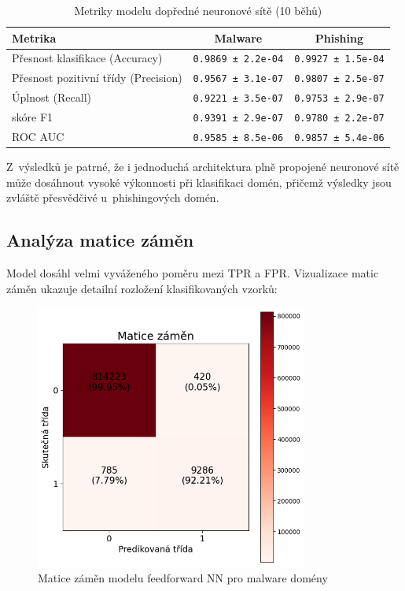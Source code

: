 \begin{table}[h!]
\centering
\begin{tabular}{|l|c|c|}
\hline
\textbf{Metrika} & \textbf{Malware} & \textbf{Phishing} \\
\hline
Přesnost klasifikace (Accuracy) & \texttt{0.9869 ± 2.2e-04} & \texttt{0.9927 ± 1.5e-04} \\
Přesnost pozitivní třídy (Precision) & \texttt{0.9567 ± 3.1e-07} & \texttt{0.9807 ± 2.5e-07} \\
Úplnost (Recall) & \texttt{0.9221 ± 3.5e-07} & \texttt{0.9753 ± 2.9e-07} \\
skóre F1 & \texttt{0.9391 ± 2.9e-07} & \texttt{0.9780 ± 2.2e-07} \\
ROC AUC & \texttt{0.9585 ± 8.5e-06} & \texttt{0.9857 ± 5.4e-06} \\
\hline
\end{tabular}
\caption{Metriky modelu dopředné neuronové sítě (10 běhů)}
\label{tab:feedforward_results}
\end{table}

Z~výsledků je patrné, že i jednoduchá architektura plně propojené neuronové sítě může dosáhnout vysoké výkonnosti při klasifikaci domén, přičemž výsledky jsou zvláště přesvědčivé u~phishingových domén.

\subsection{Analýza matice záměn}

Model dosáhl velmi vyváženého poměru mezi TPR a FPR. Vizualizace matic záměn ukazuje detailní rozložení klasifikovaných vzorků:

\begin{figure}[H]
\centering
\includegraphics[width=0.8\textwidth]{obrazky-figures/feedforward_stage_3_malware_v1.1_confusion_matrix.png}
\caption{Matice záměn modelu feedforward NN pro malware domény}
\label{fig:ffnn_conf_matrix_malware}
\end{figure}

